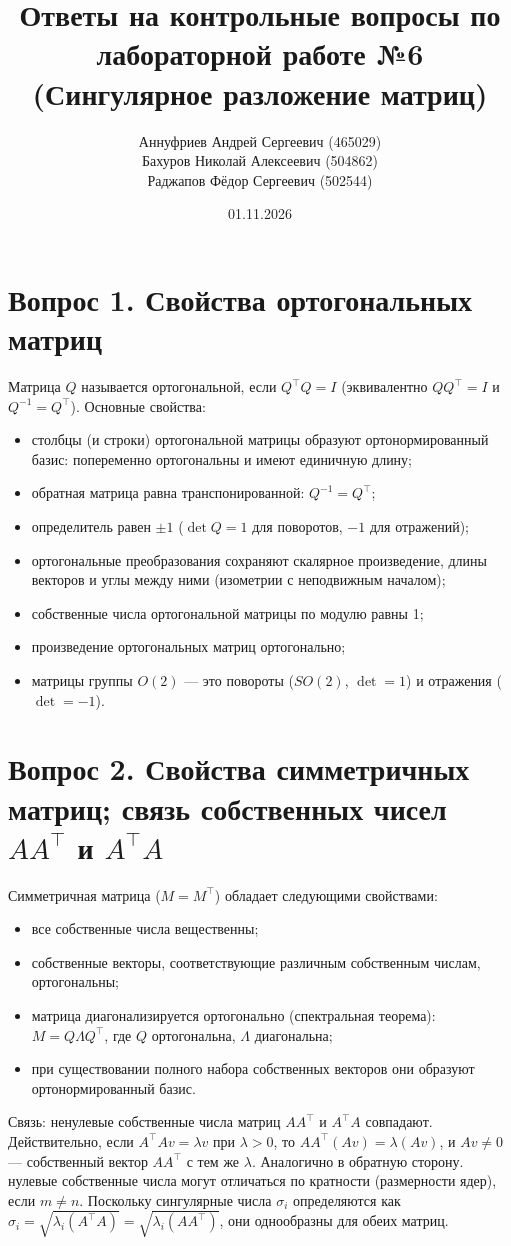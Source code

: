 \documentclass[12pt,a4paper]{article}
\title{Ответы на контрольные вопросы по лабораторной работе №6 (Сингулярное разложение матриц)}
\author{%
    Аннуфриев Андрей Сергеевич (465029)\\
    Бахуров Николай Алексеевич (504862)\\
    Раджапов Фёдор Сергеевич (502544)%
}
\date{01.11.2026}
\begin{document}
\sloppy
\maketitle

\section{Вопрос 1. Свойства ортогональных матриц}
Матрица $Q$ называется ортогональной, если $Q^\top Q = I$ (эквивалентно
$QQ^\top = I$ и $Q^{-1} = Q^\top$). Основные свойства:
\begin{itemize}
    \item столбцы (и строки) ортогональной матрицы образуют ортонормированный
    базис: попеременно ортогональны и имеют единичную длину;
    \item обратная матрица равна транспонированной: $Q^{-1}=Q^\top$;
    \item определитель равен $\pm 1$ ($\det Q = 1$ для поворотов, $-1$ для
    отражений);
    \item ортогональные преобразования сохраняют скалярное произведение,
    длины векторов и углы между ними (изометрии с неподвижным началом);
    \item собственные числа ортогональной матрицы по модулю равны 1;
    \item произведение ортогональных матриц ортогонально;
    \item матрицы группы $O(2)$ — это повороты ($SO(2)$, $\det=1$) и
    отражения ($\det=-1$).
\end{itemize}

\section{Вопрос 2. Свойства симметричных матриц; связь собственных чисел $AA^\top$ и $A^\top A$}
Симметричная матрица ($M=M^\top$) обладает следующими свойствами:
\begin{itemize}
    \item все собственные числа вещественны;
    \item собственные векторы, соответствующие различным собственным числам,
    ортогональны;
    \item матрица диагонализируется ортогонально (спектральная теорема):
    $M = Q\Lambda Q^\top$, где $Q$ ортогональна, $\Lambda$ диагональна;
    \item при существовании полного набора собственных векторов они образуют
    ортонормированный базис.
\end{itemize}
Связь: ненулевые собственные числа матриц $AA^\top$ и $A^\top A$
совпадают. Действительно, если $A^\top A v = \lambda v$ при $\lambda>0$,
то $AA^\top (Av) = \lambda(Av)$, и $Av\neq0$ — собственный вектор
$AA^\top$ с тем же $\lambda$. Аналогично в обратную сторону. нулевые
собственные числа могут отличаться по кратности (размерности ядер), если
$m\neq n$. Поскольку сингулярные числа $\sigma_i$ определяются как
$\sigma_i = \sqrt{\lambda_i(A^\top A)} = \sqrt{\lambda_i(AA^\top)}$, они
однообразны для обеих матриц.
\end{document}
